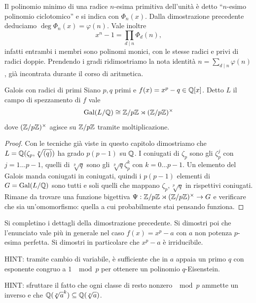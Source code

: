 Il polinomio minimo di una radice $n$-esima primitiva dell'unità è detto ``$n$-esimo polinomio ciclotomico'' e si indica con $\Phi_n(x)$. Dalla dimostrazione precedente deduciamo $\deg \Phi_n(x) = \varphi(n)$. Vale inoltre
\[
    x^n - 1 = \prod_{d \mid n}{\Phi_d(n)},
\]
infatti entrambi i membri sono polinomi monici, con le stesse radici e privi di radici doppie. Prendendo i gradi ridimostriamo la nota identità $n = \sum_{d \mid n}{\varphi(n)}$, già incontrata durante il corso di aritmetica.

\begin{theorem}{Galois con radici di primi}
    Siano $p, q$ primi e $f(x) = x^p -  q \in \mathbb{Q}[x]$. Detto $L$ il campo di spezzamento di
    $f$ vale
    \[
        \text{Gal}(L/\mathbb{Q}) \cong \mathbb{Z}/p\mathbb{Z} \rtimes (\mathbb{Z}/p\mathbb{Z})^\times
    \]
    dove $(\mathbb{Z}/p\mathbb{Z})^\times$ agisce su $\mathbb{Z}/p\mathbb{Z}$ tramite moltiplicazione.
\end{theorem}
\begin{proof}
    Con le tecniche già viste in questo capitolo dimostriamo che $L = \mathbb{Q}(\zeta_p, \sqrt[p]{(q)})$ ha grado $p(p-1)$ su $\mathbb{Q}$. I coniugati di $\zeta_p$ sono gli $\zeta_p^j$ con $j = 1 \dots p-1$, quelli di $\sqrt[p]{q}$ sono gli $\sqrt[p]q\zeta_p^k$ con $k = 0\dots p-1$. Un elemento del Galois manda coniugati in coniugati, quindi i $p(p-1)$ elementi di $G = \text{Gal}(L/\mathbb{Q})$ sono tutti e soli quelli che mappano $\zeta_p,\sqrt[p]{q}$ in rispettivi coniugati. Rimane da trovare una funzione bigettiva $\Psi : \mathbb{Z}/p\mathbb{Z} \rtimes (\mathbb{Z}/p\mathbb{Z})^\times \to G$ e verificare che sia un'omomorfismo: quella a cui probabilmente stai pensando funziona.
\end{proof}

\begin{exercise}
    Si completino i dettagli della dimostrazione precedente. Si dimostri poi che l'enunciato vale più in generale nel caso $f(x) = x^p - a$ con $a$ non potenza $p$-esima perfetta. Si dimostri in particolare che $x^p - a$ è irriducibile.

    \tiny{HINT: tramite cambio di variabile, è sufficiente che in $a$ appaia un primo $q$ con esponente congruo a $1$ $\mod p$ per ottenere un polinomio $q$-Eisenstein.}

    \tiny{HINT: sfruttare il fatto che ogni classe di resto nonzero $\mod p$ ammette un inverso e che $\mathbb{Q}(\sqrt[p]{a}^k) \subseteq \mathbb{Q}(\sqrt[p]{a})$}.
\end{exercise}


